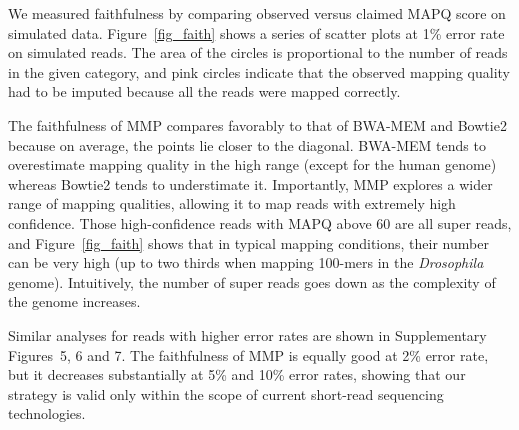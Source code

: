 \documentclass[english]{article}
\begin{document}
We measured faithfulness by comparing observed versus claimed MAPQ score
on simulated data. Figure~\ref{fig_faith} shows a series of scatter plots
at 1\% error rate on simulated reads. The area of the circles is
proportional to the number of reads in the given category, and pink
circles indicate that the observed mapping quality had to be imputed
because all the reads were mapped correctly.

The faithfulness of MMP compares favorably to that of BWA-MEM and Bowtie2
because on average, the points lie closer to the diagonal. BWA-MEM tends
to overestimate mapping quality in the high range (except for the human
genome) whereas Bowtie2 tends to understimate it. Importantly, MMP
explores a wider range of mapping qualities, allowing it to map reads with
extremely high confidence. Those high-confidence reads with MAPQ above 60
are all super reads, and Figure~\ref{fig_faith} shows that in typical
mapping conditions, their number can be very high (up to two thirds when
mapping 100-mers in the \textit{Drosophila} genome). Intuitively, the
number of super reads goes down as the complexity of the genome increases.

Similar analyses for reads with higher error rates are shown in
Supplementary Figures~5, 6 and 7. The faithfulness of MMP is equally good
at 2\% error rate, but it decreases substantially at 5\% and 10\% error
rates, showing that our strategy is valid only within the scope of current
short-read sequencing technologies.
\end{document}
